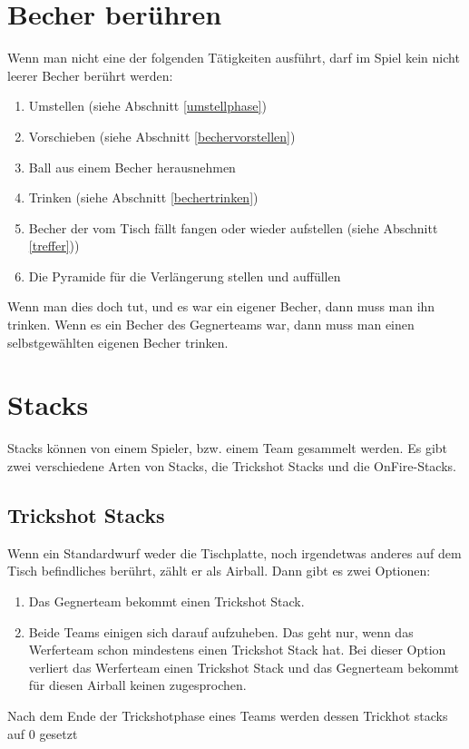 \documentclass[a5paper, 12pt]{book}
\begin{document}
\section{Becher berühren}\label{becherberühren}
Wenn man nicht eine der folgenden Tätigkeiten ausführt, darf im Spiel kein nicht leerer Becher berührt werden:
\begin{enumerate} [(1)]
    \item Umstellen (siehe Abschnitt \ref{umstellphase})
    \item Vorschieben (siehe Abschnitt \ref{bechervorstellen})
    \item Ball aus einem Becher herausnehmen
    \item Trinken (siehe Abschnitt \ref{bechertrinken})
    \item Becher der vom Tisch fällt fangen oder wieder aufstellen (siehe Abschnitt \ref{treffer}))
    \item Die Pyramide für die Verlängerung stellen und auffüllen
    
\end{enumerate}
Wenn man dies doch tut, und es war ein eigener Becher, dann muss man ihn trinken. Wenn es ein Becher des Gegnerteams war, dann muss man einen selbstgewählten eigenen Becher trinken. 
\section{Stacks}\label{stacks}
Stacks können von einem Spieler, bzw. einem Team gesammelt werden. Es gibt zwei verschiedene Arten von Stacks, die Trickshot Stacks und die OnFire-Stacks.
\subsection{Trickshot Stacks}\label{Trickshot Stacks}
Wenn ein Standardwurf weder die Tischplatte, noch irgendetwas anderes auf dem Tisch befindliches berührt, zählt er als Airball. Dann gibt es zwei Optionen:
\begin{enumerate} [(1)]
    \item Das Gegnerteam bekommt einen Trickshot Stack.
    \item Beide Teams einigen sich darauf aufzuheben. Das geht nur, wenn das Werferteam schon mindestens einen Trickshot Stack hat. Bei dieser Option verliert das Werferteam einen Trickshot Stack und das Gegnerteam bekommt für diesen Airball keinen zugesprochen. 
\end{enumerate}
Nach dem Ende der Trickshotphase eines Teams werden dessen Trickhot stacks auf 0 gesetzt
\end{document}
